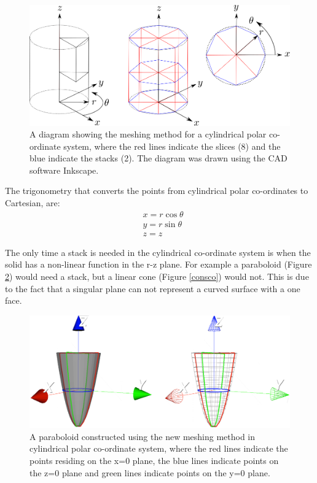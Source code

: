 \documentclass[12pt,a4paper]{article}
\begin{document}
\begin{figure}[h!]
\centering
\includegraphics[scale=0.45]{Images//Coords//cyl.png}
\caption[width=\columnwidth]{A diagram showing the meshing method for a cylindrical polar co-ordinate system, where the red lines indicate the slices (8) and the blue indicate the stacks (2). The diagram was drawn using the CAD software Inkscape.}
\label{cylmeshin}
\end{figure}
The trigonometry that converts the points from cylindrical polar co-ordinates to Cartesian, are:
\begin{equation}
\begin{aligned}
\label{cyctrig}
& x = r \cos{\theta} \\
& y = r \sin{\theta} \\
& z = z
\end{aligned}
\end{equation}

\noindent The only time a stack is needed in the cylindrical co-ordinate system is when the solid has a non-linear function in the r-z plane. For example a paraboloid (Figure \ref{paraco}) would need a stack, but a linear cone (Figure \ref{consco}) would not. This is due to the fact that a singular plane can not represent a curved surface with a one face. 

\begin{figure}[h!]
\centering
\includegraphics[scale=0.3]{Images//Coords//para.png}
\caption[width=\columnwidth]{A paraboloid constructed using the new meshing method in cylindrical polar co-ordinate system, where the red lines indicate the points residing on the x=0 plane, the blue lines indicate points on the z=0 plane and green lines indicate points on the y=0 plane.}
\label{paraco}
\end{figure}
\end{document}
